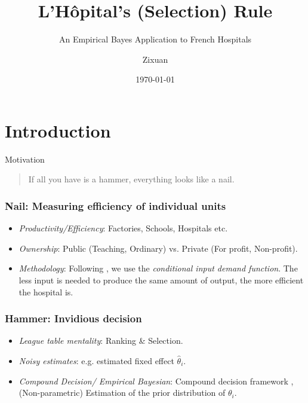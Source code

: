 \documentclass[10pt, aspectratio=169]{beamer}
\title{L'Hôpital's (Selection) Rule}
\subtitle{An Empirical Bayes Application to French Hospitals}
\date{\today}
\author{Zixuan}
\institute{Supervised by Thierry Magnac}
\begin{document}
\maketitle


\section{Introduction}

\begin{frame}[fragile]{Motivation}

  \begin{quote}
    If all you have is a hammer, everything looks like a nail.
  \end{quote}

\end{frame}

\begin{frame}[label=literature]
  \frametitle{Nail: Measuring efficiency of individual units}
  \begin{itemize}\itemsep=12pt

    \item \textit{Productivity/Efficiency}: Factories, Schools, Hospitals etc.
    \item \textit{Ownership}: Public (Teaching, Ordinary) vs. Private (For profit, Non-profit).
    \item \textit{Methodology}: Following \citet{croiset2024hospitals}, we use the \textit{conditional input demand function}.
          The less input is needed to produce the same amount
          of output, the more efficient the hospital is.\hyperlink{inputdemand}{}
  \end{itemize}
\end{frame}

\begin{frame}
  \frametitle{Hammer: Invidious decision}
  \begin{itemize}\itemsep=12pt
    \item \textit{League table mentality}: Ranking \& Selection.\citep{gu2023invidious}
    \item \textit{Noisy estimates}: e.g. estimated fixed effect $\hat{\theta}_i$. \citep{chetty2014measuring,kline2022systemic}
    \item \textit{Compound Decision/ Empirical Bayesian}: Compound decision framework \citep{robbins1956empirical}, (Non-parametric) Estimation of the prior distribution of $\theta_i$. \citep{koenker2014convex, gu2017empirical}
  \end{itemize}
\end{frame}
\end{document}

